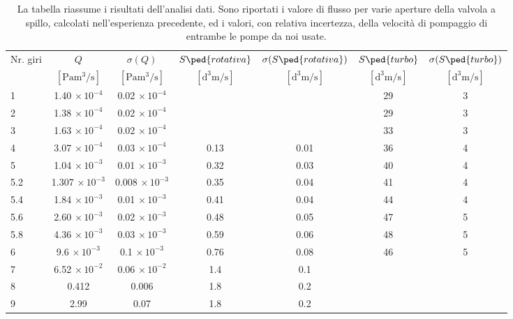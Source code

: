 \begin{table}
    \centering
    \begin{tabular}{l c c c c c c}
        \toprule
        Nr. giri & $Q$ & $\sigma (Q)$ & $S\ped{rotativa}$ & $\sigma (S\ped{rotativa})$ & $S\ped{turbo}$ & $\sigma (S\ped{turbo})$ \\

        & $[\si{\Pa\cubic\meter\per\second}]$ & $[\si{\Pa\cubic\meter\per\second}]$ &
        $[\si{\cubic\deci\meter\per\second}]$ & $[\si{\cubic\deci\meter\per\second}]$ &
        $[\si{\cubic\deci\meter\per\second}]$ & $[\si{\cubic\deci\meter\per\second}]$ \\

        \midrule
        1   & 1.40  $\times \, 10^{-4}$ & 0.02 $\times \, 10^{-4}$    &      &      & 29 & 3 \\
        2   & 1.38  $\times \, 10^{-4}$ & 0.02 $\times \, 10^{-4}$    &      &      & 29 & 3 \\
        3   & 1.63  $\times \, 10^{-4}$ & 0.02 $\times \, 10^{-4}$    &      &      & 33 & 3 \\
        4   & 3.07  $\times \, 10^{-4}$ & 0.03 $\times \, 10^{-4}$    & 0.13 & 0.01 & 36 & 4 \\
        5   & 1.04  $\times \, 10^{-3}$ & 0.01 $\times \, 10^{-3}$ & 0.32 & 0.03 & 40 & 4 \\
        5.2 & 1.307 $\times \, 10^{-3}$ & 0.008 $\times \, 10^{-3}$   & 0.35 & 0.04 & 41 & 4 \\
        5.4 & 1.84  $\times \, 10^{-3}$ & 0.01 $\times \, 10^{-3}$    & 0.41 & 0.04 & 44 & 4 \\
        5.6 & 2.60  $\times \, 10^{-3}$ & 0.02 $\times \, 10^{-3}$    & 0.48 & 0.05 & 47 & 5 \\
        5.8 & 4.36  $\times \, 10^{-3}$ & 0.03 $\times \, 10^{-3}$    & 0.59 & 0.06 & 48 & 5 \\
        6   & 9.6   $\times \, 10^{-3}$ & 0.1 $\times \, 10^{-3}$     & 0.76 & 0.08 & 46 & 5 \\
        7   & 6.52  $\times \, 10^{-2}$ & 0.06 $\times \, 10^{-2}$    & 1.4  & 0.1  &    &   \\
        8   & 0.412                     & 0.006                       & 1.8  & 0.2  &    &   \\
        9   & 2.99                      & 0.07                        & 1.8  & 0.2  &    &   \\
        \bottomrule
    \end{tabular}
    \label{tab:speed}
    \caption{La tabella riassume i risultati dell'analisi dati. Sono riportati i valore di flusso per varie aperture della
    valvola a spillo, calcolati nell'esperienza precedente, ed i valori, con relativa incertezza, della velocità di pompaggio di
    entrambe le pompe da noi usate.}
\end{table}
